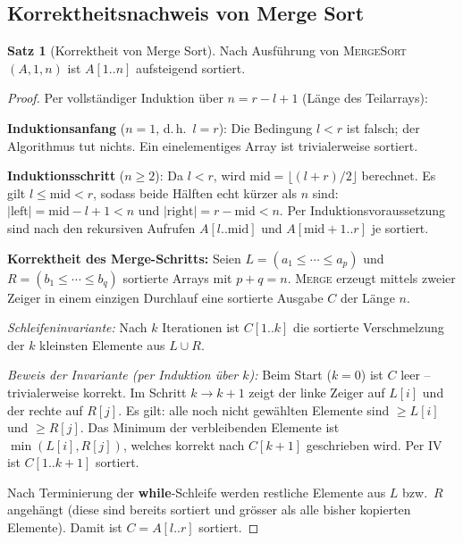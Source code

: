 ﻿\documentclass[a4paper,12pt]{article}
\theoremstyle{definition}
\newtheorem{satz}{Satz}
\begin{document}
\subsection{Korrektheitsnachweis von Merge Sort}

\begin{satz}[Korrektheit von Merge Sort]
    \label{satz:ms_correct}
    Nach Ausführung von \textsc{MergeSort}$(A, 1, n)$ ist $A[1..n]$ aufsteigend
    sortiert.
\end{satz}

\begin{proof}
    Per vollständiger Induktion über $n = r - l + 1$ (Länge des Teilarrays):

    \textbf{Induktionsanfang} ($n = 1$, d.\,h.\ $l = r$): Die Bedingung
    $l < r$ ist falsch; der Algorithmus tut nichts. Ein einelementiges Array
    ist trivialerweise sortiert. \checkmark

    \textbf{Induktionsschritt} ($n \geq 2$): Da $l < r$, wird
    $\mathrm{mid} = \lfloor (l+r)/2 \rfloor$ berechnet.
    Es gilt $l \leq \mathrm{mid} < r$, sodass beide Hälften echt kürzer als
    $n$ sind: $|\mathrm{left}| = \mathrm{mid} - l + 1 < n$ und
    $|\mathrm{right}| = r - \mathrm{mid} < n$.
    Per Induktionsvoraussetzung sind nach den rekursiven Aufrufen
    $A[l..\mathrm{mid}]$ und $A[\mathrm{mid}+1..r]$ je sortiert.

    \textbf{Korrektheit des Merge-Schritts:}
    Seien $L = (a_1 \leq \cdots \leq a_p)$ und $R = (b_1 \leq \cdots \leq b_q)$
    sortierte Arrays mit $p + q = n$. \textsc{Merge} erzeugt mittels zweier
    Zeiger in einem einzigen Durchlauf eine sortierte Ausgabe $C$ der Länge $n$.

    \emph{Schleifeninvariante:} Nach $k$ Iterationen ist $C[1..k]$ die
    sortierte Verschmelzung der $k$ kleinsten Elemente aus $L \cup R$.

    \emph{Beweis der Invariante (per Induktion über $k$):} Beim Start ($k=0$)
    ist $C$ leer -- trivialerweise korrekt. Im Schritt $k \to k+1$ zeigt
    der linke Zeiger auf $L[i]$ und der rechte auf $R[j]$. Es gilt:
    alle noch nicht gewählten Elemente sind $\geq L[i]$ und $\geq R[j]$.
    Das Minimum der verbleibenden Elemente ist $\min(L[i], R[j])$, welches
    korrekt nach $C[k+1]$ geschrieben wird. Per IV ist $C[1..k+1]$ sortiert.

    Nach Terminierung der \textbf{while}-Schleife werden restliche Elemente aus
    $L$ bzw.\ $R$ angehängt (diese sind bereits sortiert und grösser als alle
    bisher kopierten Elemente). Damit ist $C = A[l..r]$ sortiert. \qedhere
\end{proof}
\end{document}
